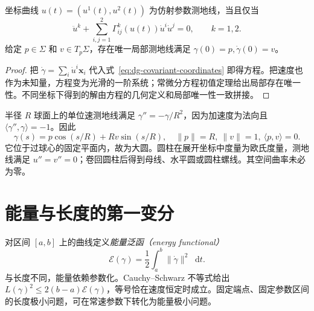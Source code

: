 \documentclass[UTF8,12pt,a4paper,fontset=fandol]{ctexbook}
\newcommand{\dd}{\mathop{}\!\mathrm d}
\newcommand{\ip}[2]{\langle #1,#2\rangle}
\newcommand{\norm}[1]{\lVert #1\rVert}
\begin{document}
\begin{theorem}[坐标方程与局部存在唯一性]
坐标曲线 $u(t)=(u^1(t),u^2(t))$ 为仿射参数测地线，当且仅当
\begin{equation}
 \ddot u^k+\sum_{i,j=1}^2\Gamma^k_{ij}(u(t))\dot u^i\dot u^j=0,
 \qquad k=1,2.
 \label{eq:dg-geodesic-equations}
\end{equation}
给定 $p\in\Sigma$ 和 $v\in T_p\Sigma$，存在唯一局部测地线满足 $\gamma(0)=p,\dot\gamma(0)=v$。
\end{theorem}
\begin{proof}
把 $\dot\gamma=\sum_i\dot u^i\mathbf x_i$ 代入式~\eqref{eq:dg-covariant-coordinates} 即得方程。把速度也作为未知量，方程变为光滑的一阶系统；常微分方程初值定理给出局部存在唯一性。不同坐标下得到的解由方程的几何定义和局部唯一性一致拼接。
\end{proof}

\begin{example}[球面与圆柱上的测地线]
半径 $R$ 球面上的单位速测地线满足 $\gamma''=-\gamma/R^2$，因为加速度为法向且 $\ip{\gamma''}\gamma=-1$。因此
\[
 \gamma(s)=p\cos(s/R)+Rv\sin(s/R),\quad
 \norm p=R,\ \norm v=1,\ \ip pv=0.
\]
它位于过球心的固定平面内，故为大圆。圆柱在展开坐标中度量为欧氏度量，测地线满足 $u''=v''=0$；卷回圆柱后得到母线、水平圆或圆柱螺线。其空间曲率未必为零。
\end{example}

\section{能量与长度的第一变分}
对区间 $[a,b]$ 上的曲线定义\emph{能量泛函（energy functional）}
\[
 \mathcal E(\gamma)=\frac12\int_a^b\norm{\dot\gamma}^2\dd t.
\]
与长度不同，能量依赖参数化。Cauchy--Schwarz 不等式给出 $L(\gamma)^2\le2(b-a)\mathcal E(\gamma)$，等号恰在速度恒定时成立。固定端点、固定参数区间的长度极小问题，可在常速参数下转化为能量极小问题。
\end{document}
